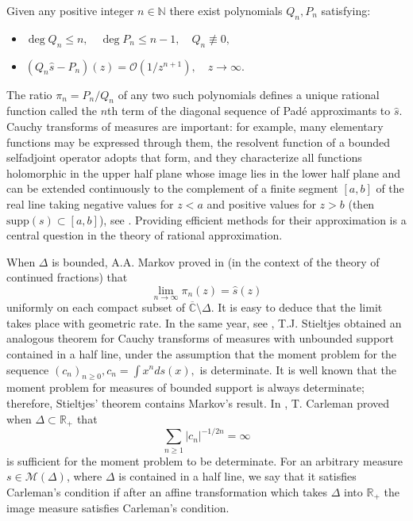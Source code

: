 \documentclass[10pt,a4paper]{article}
\theoremstyle{definition}
\theoremstyle{remark}
\numberwithin{equation}{section}
\begin{document}
Given any positive integer $n \in \mathbb{N}$ there exist polynomials $Q_n,P_n$
satisfying:
\begin{itemize}
\item $\deg Q_n \leq n,\quad  \deg P_n \leq n-1, \quad Q_n \not\equiv 0,$
\item $(Q_n \widehat{s} -P_n)(z) = \mathcal{O}(1/z^{n+1}),\quad  z \to \infty.$
\end{itemize}
The ratio  $\pi_n = P_n/Q_n$ of any two such polynomials defines a unique rational function  called the $n$th term of the diagonal sequence of Pad\'e approximants to $\widehat{s}$. Cauchy transforms of measures are important: for example, many elementary functions may be expressed through them, the resolvent function of a bounded selfadjoint operator adopts that form, and they characterize all functions holomorphic in the upper half plane whose image lies in the lower half plane and can be extended continuously to the complement of a finite segment $[a,b]$ of the real line taking negative values for $z < a$ and positive values for $z > b$ (then $\mbox{supp}(s) \subset [a,b]$), see \cite[Theorem A.6]{KN}. Providing efficient methods for their approximation is a central question in the theory of rational approximation.




When $\Delta$ is bounded,  A.A. Markov proved in \cite{Mar} (in the context of the theory of continued fractions) that
\[\lim_{n \to \infty} \pi_n(z) = \widehat{s}(z)
\]
uniformly on each compact subset of $\overline{\mathbb{C}} \setminus \Delta$.  It is easy to deduce that the limit takes place with geometric rate. In the same year, see \cite{Sti}, T.J. Stieltjes obtained an analogous theorem for Cauchy transforms of measures with unbounded support contained in a half line, under the assumption that the moment problem for the sequence $\left(c_n\right)_{n\geq 0}, c_n = \int x^n ds(x),$ is determinate. It is well known that the moment problem for measures of bounded support  is always determinate; therefore, Stieltjes' theorem contains Markov's result. In \cite{Car}, T. Carleman  proved  when $\Delta \subset \mathbb{R}_+$ that
\begin{equation} \label{Carle} \sum_{n \geq 1} |c_{n}|^{-1/2n} = \infty
\end{equation}
is sufficient for the moment problem to be determinate. For an arbitrary measure  $s \in \mathcal{M}(\Delta)$, where $\Delta$ is contained in a half line, we say that it satisfies Carleman's condition if after an affine transformation which takes $\Delta$ into $\mathbb{R}_+$ the image measure satisfies Carleman's condition.
\end{document}
